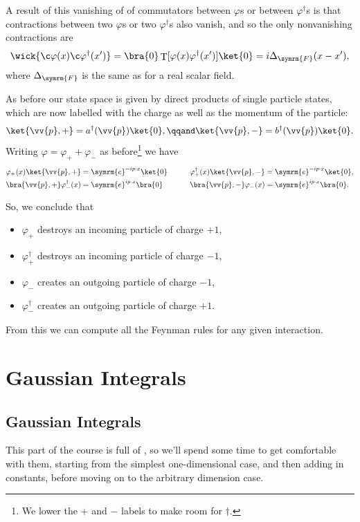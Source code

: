 \documentclass[fleqn]{NotesClass}
\newcommand{\e}{\symrm{e}}
\newcommand{\hermit}{{\dagger}}
\DeclareMathOperator{\timeOrdering}{T}
\newcommand{\feynman}{\symrm{F}}
\begin{document}
    A result of this vanishing of of commutators between \(\varphi\)s or between \(\varphi^\hermit\)s is that contractions between two \(\varphi\)s or two \(\varphi^\hermit\)s also vanish, and so the only nonvanishing contractions are
    \begin{equation}
        \wick{\c \varphi(x) \c \varphi^\hermit(x')} = \bra{0} \timeOrdering[\varphi(x) \varphi^\hermit(x')] \ket{0} = i\Delta_{\feynman}(x - x'),
    \end{equation}
    where \(\Delta_{\feynman}\) is the same as for a real scalar field.
    
    As before our state space is given by direct products of single particle states, which are now labelled with the charge as well as the momentum of the particle:
    \begin{equation}
        \ket{\vv{p}, +} = a^\hermit(\vv{p})\ket{0}, \qqand \ket{\vv{p}, -} = b^\hermit(\vv{p})\ket{0}.
    \end{equation}
    Writing \(\varphi = \varphi_+ + \varphi_-\) as before\footnote{We lower the \(+\) and \(-\) labels to make room for \(\hermit\).} we have
    \begin{alignat}{2}
        \varphi_+(x)\ket{\vv{p}, +} &= \e^{-ip\cdot x} \ket{0} \qquad & \varphi_+^\hermit(x)\ket{\vv{p}, -} &= \e^{-ip\cdot x}\ket{0},\\
        \bra{\vv{p}, +}\varphi_-^\hermit(x) &= \e^{ip\cdot x} \bra{0} \qquad & \bra{\vv{p}, -} \varphi_-(x) &= \e^{ip\cdot x}\bra{0}.
    \end{alignat}
    
    So, we conclude that
    \begin{itemize}
        \item \(\varphi_+\) destroys an incoming particle of charge \(+1\),
        \item \(\varphi_+^\hermit\) destroys an incoming particle of charge \(-1\),
        \item \(\varphi_-\) creates an outgoing particle of charge \(-1\),
        \item \(\varphi_-^\hermit\) creates an outgoing particle of charge \(+1\).
    \end{itemize}
    From this we can compute all the Feynman rules for any given interaction.
    
    \part{Gaussian Integrals}
    \chapter{Gaussian Integrals}
    This part of the course is full of , so we'll spend some time to get comfortable with them, starting from the simplest one-dimensional case, and then adding in constants, before moving on to the arbitrary dimension case.
\end{document}
